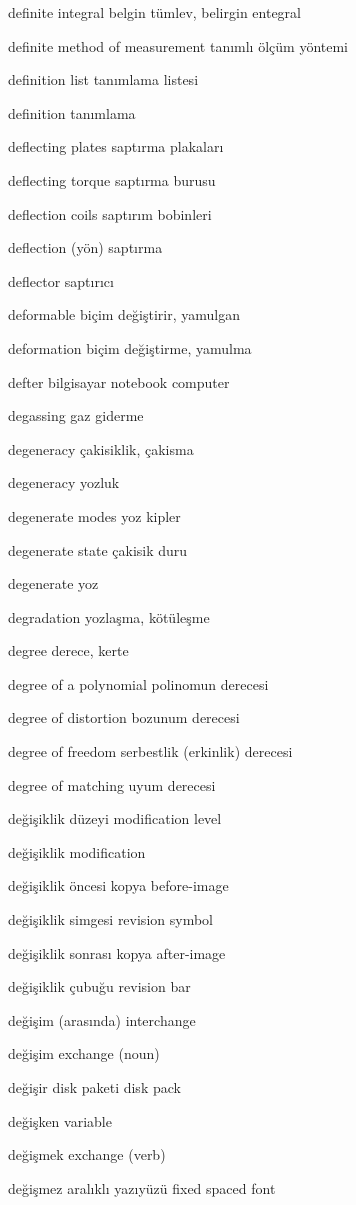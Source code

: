 \documentclass[12pt,fleqn]{article}\usepackage{../../common}
\begin{document}
definite integral belgin tümlev, belirgin entegral

definite method of measurement tanımlı ölçüm yöntemi

definition list tanımlama listesi

definition tanımlama

deflecting plates saptırma plakaları

deflecting torque saptırma burusu

deflection coils saptırım bobinleri

deflection (yön) saptırma

deflector saptırıcı

deformable biçim değiştirir, yamulgan

deformation biçim değiştirme, yamulma

defter bilgisayar notebook computer

degassing gaz giderme

degeneracy çakisiklik, çakisma

degeneracy yozluk

degenerate modes yoz kipler

degenerate state çakisik duru

degenerate yoz

degradation yozlaşma, kötüleşme

degree derece, kerte

degree of a polynomial polinomun derecesi

degree of distortion bozunum derecesi

degree of freedom serbestlik (erkinlik) derecesi

degree of matching uyum derecesi

değişiklik düzeyi modification level

değişiklik modification

değişiklik öncesi kopya before-image

değişiklik simgesi revision symbol

değişiklik sonrası kopya after-image

değişiklik çubuğu revision bar

değişim (arasında) interchange

değişim exchange (noun)

değişir disk paketi disk pack

değişken variable

değişmek exchange (verb)

değişmez aralıklı yazıyüzü fixed spaced font
\end{document}
